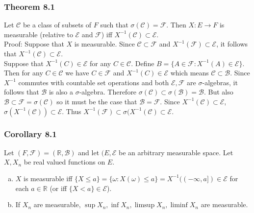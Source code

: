 \documentclass{article}
\begin{document}
{\subsubsection*{Theorem 8.1}

Let $\mathcal{C}$ be a class of subsets of $F$ such that $\sigma(\mathcal{C}) = \mathcal{F}$. Then $X : E \rightarrow F$ is measurable (relative to $\mathcal{E}$ and $\mathcal{F}$) iff $X^{-1}(\mathcal{C}) \subset \mathcal{E}$. \\

Proof: Suppose that $X$ is measurable. Since $\mathcal{C} \subset \mathcal{F}$ and $X^{-1}(\mathcal{F}) \subset \mathcal{E}$, it follows that $X^{-1}(\mathcal{C}) \subset \mathcal{E}$. \\

Suppose that $X^{-1}(C) \in \mathcal{E}$ for any $C \in \mathcal{C}$. Define $B = \{A \in \mathcal{F} : X^{-1}(A) \in \mathcal{E}\}$. Then for any $C \in \mathcal{C}$ we have $C \in \mathcal{F}$ and $X^{-1}(C) \in \mathcal{E}$ which means $\mathcal{C} \subset \mathcal{B}$. Since $X^{-1}$ commutes with countable set operations and both $\mathcal{E}, \mathcal{F}$ are $\sigma$-algebras, it follows that $\mathcal{B}$ is also a $\sigma$-algebra. Therefore $\sigma(\mathcal{C}) \subset \sigma(\mathcal{B}) = \mathcal{B}$. But also $\mathcal{B} \subset \mathcal{F} = \sigma(\mathcal{C})$ so it must be the case that $\mathcal{B} = \mathcal{F}$. Since $X^{-1}(\mathcal{C}) \subset \mathcal{E}$, $\sigma(X^{-1}(\mathcal{C})) \subset \mathcal{E}$. Thus $X^{-1}(\mathcal{F}) \subset \sigma(X^{-1}(\mathcal{C}) \subset \mathcal{E}$. 

\subsubsection*{Corollary 8.1}

Let $(F, \mathcal{F}) = (\mathbb{R}, \mathcal{B})$ and let $(E, \mathcal{E}$ be an arbitrary measurable space. Let $X, X_n$ be real valued functions on $E$. 

\begin{enumerate}[a)]
\item $X$ is measurable iff $\{X \leq a\} = \{\omega : X(\omega) \leq a\} = X^{-1}((-\infty, a]) \in \mathcal{E}$ for each $a \in \mathbb{R}$ (or iff $\{X < a\} \in \mathcal{E}$). 

\item If $X_n$ are measurable, $\sup X_n, \inf X_n, \limsup X_n, \liminf X_n$ are measurable. 


\end{enumerate}}
\end{document}
